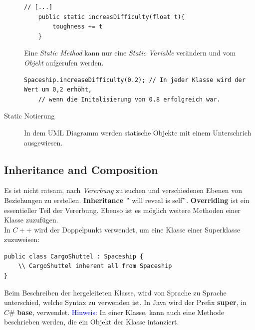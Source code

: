 \begin{description}
\begin{lstlisting}[style=C++]
	// [...]
	public static increasDifficulty(float t){
		toughness += t
	}
\end{lstlisting}
Eine \textit{Static Method} kann nur eine \textit{Static Variable} verändern und vom \textit{Objekt} aufgerufen werden.
\begin{lstlisting}[style=C++]
	Spaceship.increaseDifficulty(0.2); // In jeder Klasse wird der Wert um 0,2 erhöht,
	// wenn die Initalisierung von 0.8 erfolgreich war.
\end{lstlisting}
\item[Static Notierung] In dem UML Diagramm werden statische Objekte mit einem Unterschrich ausgewiesen.
\begin{figure}[H]
	\centering
\end{figure} 
\end{description}
\subsection{Inheritance and Composition}
Es ist nicht ratsam, nach \textit{Vererbung} zu suchen und verschiedenen Ebenen von Beziehungen zu erstellen. \textbf{Inheritance} $"$ will reveal is self$"$. \textbf{Overriding} ist ein essentieller Teil der Vererbung. Ebenso ist es möglich weitere Methoden einer Klasse zuzufügen. \\

In $C++$ wird der Doppelpunkt verwendet, um eine Klasse einer Superklasse zuzuweisen:
\begin{lstlisting}[style=C++]
public class CargoShuttel : Spaceship {
	\\ CargoShuttel inherent all from Spaceship
}
\end{lstlisting}
Beim Beschreiben der hergeleiteten Klasse, wird von Sprache zu Sprache unterschied, welche Syntax zu verwenden ist. In Java wird der Prefix \textbf{super}, in $C\#$ \textbf{base}, verwendet. 
\textcolor{blue}{Hinweis:} In einer Klasse, kann auch eine Methode beschrieben werden, die ein Objekt der Klasse intanziert.\\

